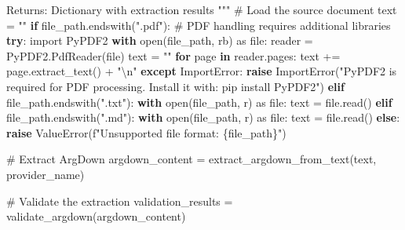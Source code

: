 \documentclass[
  11pt,
  letterpaper,
]{book}
\newenvironment{Shaded}{\begin{snugshade}}{\end{snugshade}}
\newcommand{\BuiltInTok}[1]{\textcolor[rgb]{0.00,0.23,0.31}{#1}}
\newcommand{\CharTok}[1]{\textcolor[rgb]{0.13,0.47,0.30}{#1}}
\newcommand{\CommentTok}[1]{\textcolor[rgb]{0.37,0.37,0.37}{#1}}
\newcommand{\ControlFlowTok}[1]{\textcolor[rgb]{0.00,0.23,0.31}{\textbf{#1}}}
\newcommand{\ImportTok}[1]{\textcolor[rgb]{0.00,0.46,0.62}{#1}}
\newcommand{\KeywordTok}[1]{\textcolor[rgb]{0.00,0.23,0.31}{\textbf{#1}}}
\newcommand{\NormalTok}[1]{\textcolor[rgb]{0.00,0.23,0.31}{#1}}
\newcommand{\OperatorTok}[1]{\textcolor[rgb]{0.37,0.37,0.37}{#1}}
\newcommand{\PreprocessorTok}[1]{\textcolor[rgb]{0.68,0.00,0.00}{#1}}
\newcommand{\SpecialCharTok}[1]{\textcolor[rgb]{0.37,0.37,0.37}{#1}}
\newcommand{\SpecialStringTok}[1]{\textcolor[rgb]{0.13,0.47,0.30}{#1}}
\newcommand{\StringTok}[1]{\textcolor[rgb]{0.13,0.47,0.30}{#1}}
\begin{document}
\begin{Shaded}
\begin{Highlighting}[]
\CommentTok{    Returns:}
\CommentTok{        Dictionary with extraction results}
\CommentTok{    """}
    \CommentTok{\# Load the source document}
\NormalTok{    text }\OperatorTok{=} \StringTok{""}
    \ControlFlowTok{if}\NormalTok{ file\_path.endswith(}\StringTok{".pdf"}\NormalTok{):}
        \CommentTok{\# PDF handling requires additional libraries}
        \ControlFlowTok{try}\NormalTok{:}
            \ImportTok{import}\NormalTok{ PyPDF2}
            \ControlFlowTok{with} \BuiltInTok{open}\NormalTok{(file\_path, }\StringTok{\textquotesingle{}rb\textquotesingle{}}\NormalTok{) }\ImportTok{as} \BuiltInTok{file}\NormalTok{:}
\NormalTok{                reader }\OperatorTok{=}\NormalTok{ PyPDF2.PdfReader(}\BuiltInTok{file}\NormalTok{)}
\NormalTok{                text }\OperatorTok{=} \StringTok{""}
                \ControlFlowTok{for}\NormalTok{ page }\KeywordTok{in}\NormalTok{ reader.pages:}
\NormalTok{                    text }\OperatorTok{+=}\NormalTok{ page.extract\_text() }\OperatorTok{+} \StringTok{"}\CharTok{\textbackslash{}n}\StringTok{"}
        \ControlFlowTok{except} \PreprocessorTok{ImportError}\NormalTok{:}
            \ControlFlowTok{raise} \PreprocessorTok{ImportError}\NormalTok{(}\StringTok{"PyPDF2 is required for PDF processing. Install it with: pip install PyPDF2"}\NormalTok{)}
    \ControlFlowTok{elif}\NormalTok{ file\_path.endswith(}\StringTok{".txt"}\NormalTok{):}
        \ControlFlowTok{with} \BuiltInTok{open}\NormalTok{(file\_path, }\StringTok{\textquotesingle{}r\textquotesingle{}}\NormalTok{) }\ImportTok{as} \BuiltInTok{file}\NormalTok{:}
\NormalTok{            text }\OperatorTok{=} \BuiltInTok{file}\NormalTok{.read()}
    \ControlFlowTok{elif}\NormalTok{ file\_path.endswith(}\StringTok{".md"}\NormalTok{):}
        \ControlFlowTok{with} \BuiltInTok{open}\NormalTok{(file\_path, }\StringTok{\textquotesingle{}r\textquotesingle{}}\NormalTok{) }\ImportTok{as} \BuiltInTok{file}\NormalTok{:}
\NormalTok{            text }\OperatorTok{=} \BuiltInTok{file}\NormalTok{.read()}
    \ControlFlowTok{else}\NormalTok{:}
        \ControlFlowTok{raise} \PreprocessorTok{ValueError}\NormalTok{(}\SpecialStringTok{f"Unsupported file format: }\SpecialCharTok{\{}\NormalTok{file\_path}\SpecialCharTok{\}}\SpecialStringTok{"}\NormalTok{)}

    \CommentTok{\# Extract ArgDown}
\NormalTok{    argdown\_content }\OperatorTok{=}\NormalTok{ extract\_argdown\_from\_text(text, provider\_name)}

    \CommentTok{\# Validate the extraction}
\NormalTok{    validation\_results }\OperatorTok{=}\NormalTok{ validate\_argdown(argdown\_content)}


\end{Highlighting}
\end{Shaded}
\end{document}
